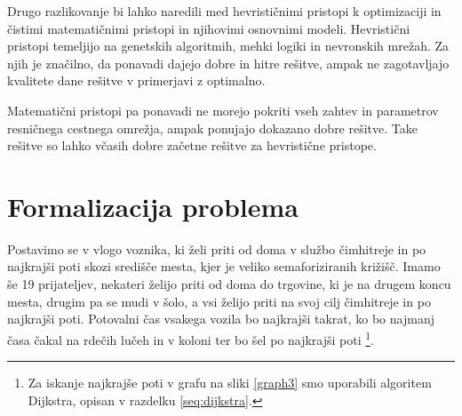 \documentclass[a4paper, 12pt]{book}
\begin{document}
Drugo razlikovanje bi lahko naredili med hevristi\v cnimi pristopi k optimizaciji in \v cistimi matemati\v cnimi pristopi in njihovimi osnovnimi modeli. Hevristi\v cni pristopi temeljijo na genetskih algoritmih, mehki logiki in nevronskih mre\v zah. Za njih je zna\v cilno, da ponavadi dajejo dobre in hitre re\v sitve, ampak ne zagotavljajo  kvalitete dane re\v sitve v primerjavi z optimalno.

Matemati\v cni pristopi pa ponavadi ne morejo pokriti vseh zahtev in parametrov resni\v cnega cestnega omre\v zja, ampak ponujajo dokazano dobre re\v sitve. Take re\v sitve so lahko v\v casih dobre za\v cetne re\v sitve za hevristi\v cne pristope.

\section{Formalizacija problema}
Postavimo se v vlogo voznika, ki \v zeli priti od doma v slu\v zbo \v cimhitreje in po najkraj\v si poti skozi sredi\v s\v ce mesta, kjer je veliko semaforiziranih kri\v zi\v s\v c. Imamo \v se 19 prijateljev, nekateri \v zelijo priti od doma do trgovine, ki je na drugem koncu mesta, drugim pa se mudi v \v solo, a vsi \v zelijo priti na svoj cilj \v cimhitreje in po najkraj\v si poti. Potovalni \v cas vsakega vozila bo najkraj\v si takrat, ko bo najmanj \v casa \v cakal na rde\v cih lu\v ceh in v koloni ter bo \v sel po najkraj\v si poti
\footnote{Za iskanje najkraj\v se poti v grafu na sliki \ref{graph3} smo uporabili algoritem Dijkstra, opisan v razdelku \ref{seq:dijkstra}.}.
\end{document}
